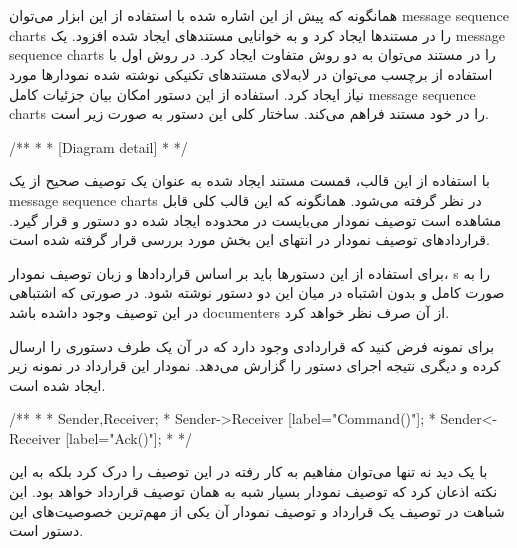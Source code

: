 

\section{}

همانگونه که پیش از این اشاره شده با استفاده از این ابزار می‌توان \glspl{message
sequence chart} را در مستند‌ها ایجاد کرد و به خوانایی مستند‌های ایجاد شده افزود.
یک \glspl{message sequence chart} را در مستند می‌توان به دو روش متفاوت ایجاد
کرد. در روش اول با استفاده از برچسب  می‌توان در لابه‌لای مستندهای تکنیکی
نوشته شده نمودارها مورد نیاز ایجاد کرد. استفاده از این دستور امکان بیان جزئیات
کامل \glspl{message sequence chart} را در خود مستند فراهم می‌کند. ساختار کلی این
دستور به صورت زیر است.
 
\begin{C++}
/**
 * \msc
 * [Diagram detail]
 * \endmsc
 */
\end{C++}

با استفاده از این قالب، قمست مستند ایجاد شده به عنوان یک توصیف صحیح از یک
\glspl{message sequence chart} در نظر گرفته می‌شود. همانگونه که این قالب کلی
قابل مشاهده است توصیف نمودار می‌بایست در محدوده ایجاد شده دو دستور  و
 قرار گیرد. قراردادهای توصیف نمودار در انتهای این بخش مورد بررسی قرار
گرفته شده است.

\begin{note}
برای استفاده از این دستورها باید بر اساس قراردادها و زبان توصیف نمودار، \glspl{}
را به صورت کامل و بدون اشتباه در میان این دو دستور نوشته شود. در صورتی که
اشتباهی در این توصیف وجود داشده باشد \glspl{documenter} از آن صرف نظر خواهد کرد.
\end{note}

برای نمونه فرض کنید که قراردادی وجود دارد که در آن یک طرف دستوری را ارسال کرده و
دیگری نتیجه اجرای دستور را گزارش می‌دهد. نمودار این قرارداد در نمونه زیر ایجاد
شده است.

\begin{C++}
/**
 * \msc
 * Sender,Receiver;
 * Sender->Receiver [label="Command()"];
 * Sender<-Receiver [label="Ack()"];
 * \endmsc
 */
\end{C++}

با یک دید نه تنها می‌توان مفاهیم به کار رفته در این توصیف را درک کرد بلکه به این
نکته اذعان کرد که توصیف نمودار بسیار شبه به همان توصیف قرارداد خواهد بود. این
شباهت در توصیف یک قرارداد و توصیف نمودار آن یکی از مهم‌ترین خصوصیت‌های این دستور
است.


